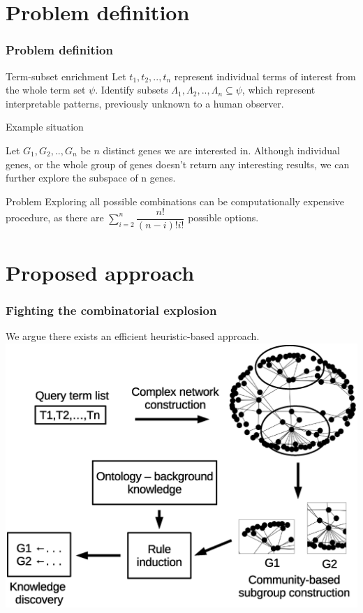 \documentclass{beamer}
\begin{document}
\section{Problem definition} 
  \begin{frame}\frametitle{Problem definition}

    \begin{block}{Term-subset enrichment}
      Let ${t_{1},t_{2},..,t_{n}}$ represent individual terms of interest from the whole term set $\psi $. Identify subsets $\Lambda_{1},\Lambda_{2},..,\Lambda_{n} \subseteq \psi$, which represent interpretable patterns, previously unknown to a human observer.      
    \end{block}

    \begin{exampleblock}{Example situation}

      Let $G_{1},G_{2},..,G_{n}$ be $n$ distinct genes we are interested in. Although individual genes, or the whole group of genes doesn't return any interesting results, we can further explore the subspace of n genes.

    \end{exampleblock}
    \begin{alertblock}{Problem}
      Exploring all possible combinations can be computationally expensive procedure, as there are $\sum_{i=2}^{n}\dfrac{n!}{(n-i)!i!}$ possible options.      
    \end{alertblock}      
  \end{frame}

\section{Proposed approach}
  \begin{frame}\frametitle{Fighting the combinatorial explosion}

    We argue there exists an efficient heuristic-based approach.
      \includegraphics[scale=0.35]{images/workflow2}       
   \end{frame}
\end{document}
